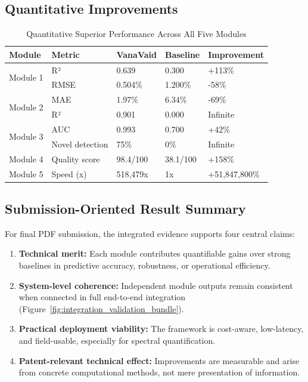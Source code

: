 \documentclass[11pt,a4paper]{article}
\begin{document}
\subsection{Quantitative Improvements}

\begin{table}[H]
\centering
\caption{Quantitative Superior Performance Across All Five Modules}
\label{tab:quantitative_comparison}
\small
\begin{tabular}{|l|l|l|l|l|}
\hline
\textbf{Module} & \textbf{Metric} & \textbf{VanaVaid} & \textbf{Baseline} & \textbf{Improvement} \\
\hline
\multirow{2}{*}{Module 1} & R² & 0.639 & 0.300 & +113\% \\
\cline{2-5}
& RMSE & 0.504\% & 1.200\% & -58\% \\
\hline
\multirow{2}{*}{Module 2} & MAE & 1.97\% & 6.34\% & -69\% \\
\cline{2-5}
& R² & 0.901 & 0.000 & Infinite \\
\hline
\multirow{2}{*}{Module 3} & AUC & 0.993 & 0.700 & +42\% \\
\cline{2-5}
& Novel detection & 75\% & 0\% & Infinite \\
\hline
Module 4 & Quality score & 98.4/100 & 38.1/100 & +158\% \\
\hline
Module 5 & Speed (x) & 518,479x & 1x & +51,847,800\% \\
\hline
\end{tabular}
\end{table}

\subsection{Submission-Oriented Result Summary}

For final PDF submission, the integrated evidence supports four central claims:
\begin{enumerate}
    \item \textbf{Technical merit:} Each module contributes quantifiable gains over strong baselines in predictive accuracy, robustness, or operational efficiency.
    \item \textbf{System-level coherence:} Independent module outputs remain consistent when connected in full end-to-end integration (Figure~\ref{fig:integration_validation_bundle}).
    \item \textbf{Practical deployment viability:} The framework is cost-aware, low-latency, and field-usable, especially for spectral quantification.
    \item \textbf{Patent-relevant technical effect:} Improvements are measurable and arise from concrete computational methods, not mere presentation of information.
\end{enumerate}
\end{document}
